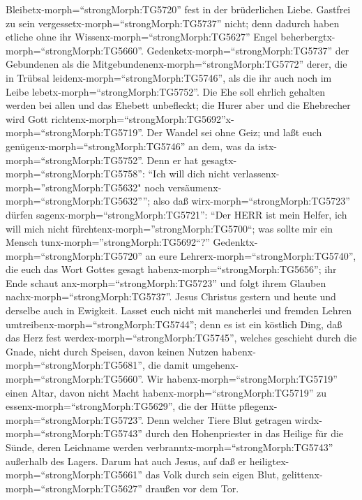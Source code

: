  Bleibetx-morph=``strongMorph:TG5720'' fest in der
brüderlichen Liebe.  Gastfrei zu sein
vergessetx-morph=``strongMorph:TG5737'' nicht; denn dadurch haben
etliche ohne ihr Wissenx-morph=``strongMorph:TG5627'' Engel
beherbergtx-morph=``strongMorph:TG5660''. 
Gedenketx-morph=``strongMorph:TG5737'' der Gebundenen als die
Mitgebundenenx-morph=``strongMorph:TG5772'' derer, die in Trübsal
leidenx-morph=``strongMorph:TG5746'', als die ihr auch noch im Leibe
lebetx-morph=``strongMorph:TG5752''.  Die Ehe soll ehrlich
gehalten werden bei allen und das Ehebett unbefleckt; die Hurer aber und
die Ehebrecher wird Gott
richtenx-morph=``strongMorph:TG5692''\textbar x-morph=``strongMorph:TG5719''.
 Der Wandel sei ohne Geiz; und laßt euch
genügenx-morph=``strongMorph:TG5746'' an dem, was da
istx-morph=``strongMorph:TG5752''. Denn er hat
gesagtx-morph=``strongMorph:TG5758'': ``Ich will dich nicht
verlassenx-morph=''strongMorph:TG5632" noch
versäumenx-morph=``strongMorph:TG5632'''';  also daß
wirx-morph=``strongMorph:TG5723'' dürfen
sagenx-morph=``strongMorph:TG5721'': ``Der HERR ist mein Helfer, ich
will mich nicht fürchtenx-morph=''strongMorph:TG5700``; was sollte mir
ein Mensch tunx-morph=''strongMorph:TG5692``?'' 
Gedenktx-morph=``strongMorph:TG5720'' an eure
Lehrerx-morph=``strongMorph:TG5740'', die euch das Wort Gottes gesagt
habenx-morph=``strongMorph:TG5656''; ihr Ende schaut
anx-morph=``strongMorph:TG5723'' und folgt ihrem Glauben
nachx-morph=``strongMorph:TG5737''.  Jesus Christus gestern
und heute und derselbe auch in Ewigkeit.  Lasset euch nicht
mit mancherlei und fremden Lehren
umtreibenx-morph=``strongMorph:TG5744''; denn es ist ein köstlich Ding,
daß das Herz fest werdex-morph=``strongMorph:TG5745'', welches geschieht
durch die Gnade, nicht durch Speisen, davon keinen Nutzen
habenx-morph=``strongMorph:TG5681'', die damit
umgehenx-morph=``strongMorph:TG5660''.  Wir
habenx-morph=``strongMorph:TG5719'' einen Altar, davon nicht Macht
habenx-morph=``strongMorph:TG5719'' zu
essenx-morph=``strongMorph:TG5629'', die der Hütte
pflegenx-morph=``strongMorph:TG5723''.  Denn welcher Tiere
Blut getragen wirdx-morph=``strongMorph:TG5743'' durch den Hohenpriester
in das Heilige für die Sünde, deren Leichname werden
verbranntx-morph=``strongMorph:TG5743'' außerhalb des Lagers.
 Darum hat auch Jesus, auf daß er
heiligtex-morph=``strongMorph:TG5661'' das Volk durch sein eigen Blut,
gelittenx-morph=``strongMorph:TG5627'' draußen vor dem Tor.
